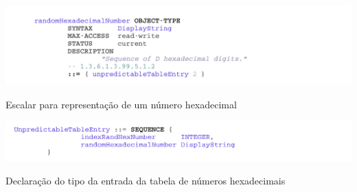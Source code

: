 \begin{center}
 	
 	\includegraphics[width=\textwidth,height=\textheight,keepaspectratio]{resources/images/faseA/mib/tables/hexadecimalnumber.png}
 	\captionsetup{type=figure, width=0.8\linewidth}
	\caption{Escalar para representação de um número hexadecimal}
\label{fig:fasea:} 
\end{center}

\begin{center}
 	
 	\includegraphics[width=\textwidth,height=\textheight,keepaspectratio]{resources/images/faseA/mib/tables/tableentrydefinition.png}
 	\captionsetup{type=figure, width=0.8\linewidth}
	\caption{Declaração do tipo da entrada da tabela de números hexadecimais}
\label{fig:fasea:} 
\end{center}












